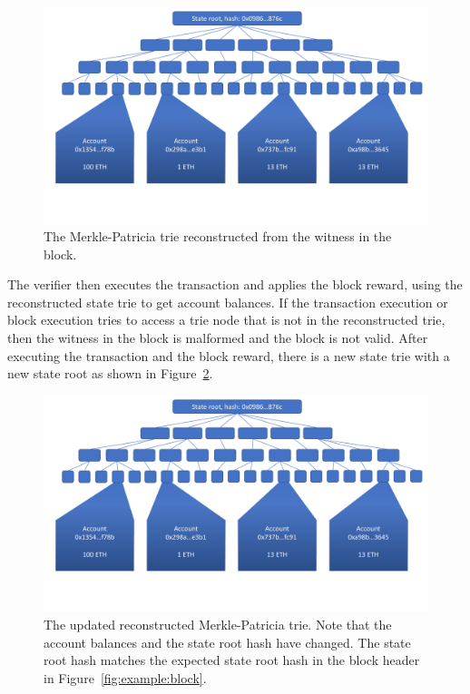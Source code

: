\documentclass[12pt]{article}
\begin{document}
\begin{figure}[H]
  \centering
  \includegraphics[width=\textwidth,page=5]{../figures/design/example.pdf}
  \caption{The Merkle-Patricia trie reconstructed from the witness in the block.}
  \label{fig:example:reconstructed}
\end{figure}

The verifier then executes the transaction and applies the block reward, using the reconstructed state trie to get account balances. If the transaction execution or block execution tries to access a trie node that is not in the reconstructed trie, then the witness in the block is malformed and the block is not valid. After executing the transaction and the block reward, there is a new state trie with a new state root as shown in Figure~\ref{fig:example:newconstructed}.

\begin{figure}[H]
  \centering
  \includegraphics[width=\textwidth,page=6]{../figures/design/example.pdf}
  \caption{The updated reconstructed Merkle-Patricia trie. Note that the account balances and the state root hash have changed. The state root hash matches the expected state root hash in the block header in Figure~\ref{fig:example:block}.}
  \label{fig:example:newconstructed}
\end{figure}
\end{document}
